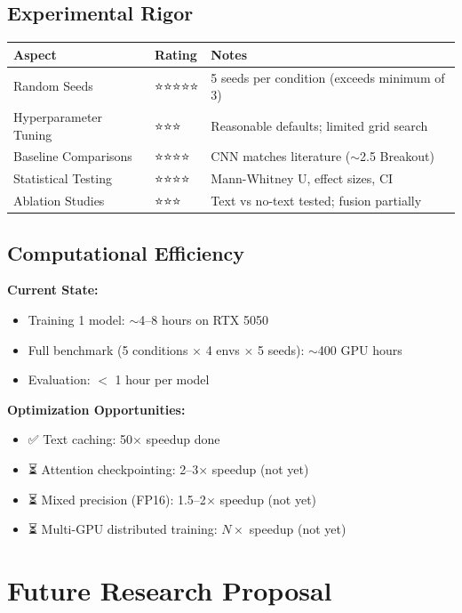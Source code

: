 \documentclass[12pt,a4paper,openany]{report}
\begin{document}
\section{Experimental Rigor}

\begin{table}[H]
\centering
\small
\begin{tabular}{lll}
\toprule
Aspect & Rating & Notes \\
\midrule
Random Seeds & ⭐⭐⭐⭐⭐ & 5 seeds per condition (exceeds minimum of 3) \\
Hyperparameter Tuning & ⭐⭐⭐ & Reasonable defaults; limited grid search \\
Baseline Comparisons & ⭐⭐⭐⭐ & CNN matches literature ($\sim$2.5 Breakout) \\
Statistical Testing & ⭐⭐⭐⭐ & Mann-Whitney U, effect sizes, CI \\
Ablation Studies & ⭐⭐⭐ & Text vs no-text tested; fusion partially \\
\bottomrule
\end{tabular}
\end{table}

\section{Computational Efficiency}

\textbf{Current State:}
\begin{itemize}
    \item Training 1 model: $\sim$4--8 hours on RTX 5050
    \item Full benchmark (5 conditions $\times$ 4 envs $\times$ 5 seeds): $\sim$400 GPU hours
    \item Evaluation: $<$ 1 hour per model
\end{itemize}

\textbf{Optimization Opportunities:}
\begin{itemize}
    \item ✅ Text caching: 50$\times$ speedup done
    \item ⏳ Attention checkpointing: 2--3$\times$ speedup (not yet)
    \item ⏳ Mixed precision (FP16): 1.5--2$\times$ speedup (not yet)
    \item ⏳ Multi-GPU distributed training: $N\times$ speedup (not yet)
\end{itemize}

\chapter{Future Research Proposal}
\end{document}
